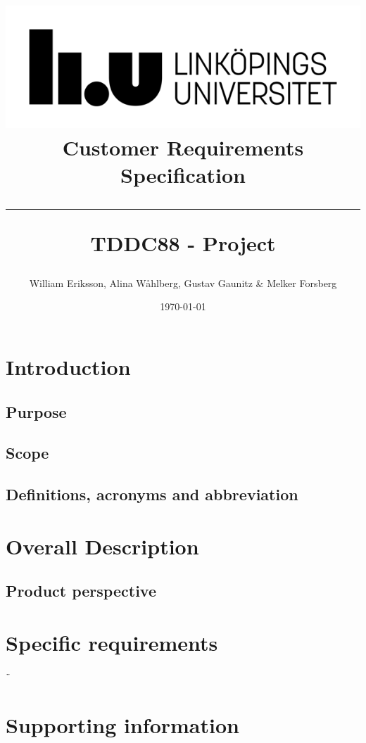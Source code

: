 \documentclass{article}
\title{
\includegraphics[scale=1.5]{liu_logga.png} \\
\vspace{2.0cm} \textbf{Customer Requirements Specification} \\
 \endgraf\rule{\textwidth}{.4pt}
  \large \textbf{TDDC88 - Project}\\
   }
\author{William Eriksson, Alina Wåhlberg, Gustav Gaunitz \& Melker Forsberg}
\date{\today}
\begin{document}
\maketitle


\newpage
\tableofcontents
\newpage

\section{Introduction}


\subsection{Purpose}



\subsection{Scope}


\subsection{Definitions, acronyms and abbreviation}

\newpage

\section{Overall Description}

\subsection{Product perspective}

\newpage

\section{Specific requirements}


\newpage
¨%
\section{Supporting information}

\newpage
\printbibliography
\end{document}
